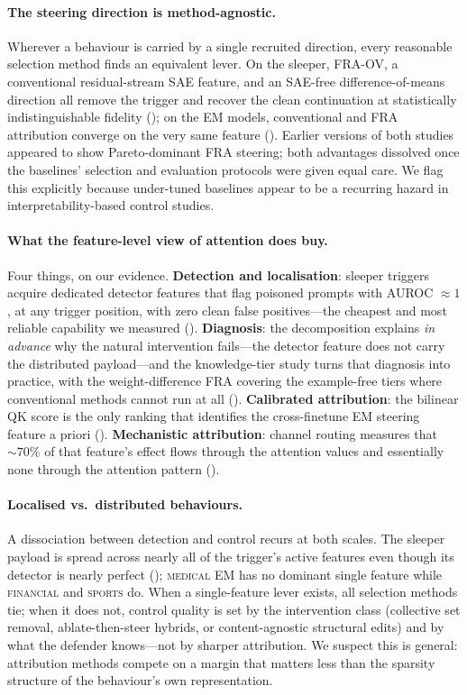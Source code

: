 \documentclass{article}
\theoremstyle{plain}
\theoremstyle{definition}
\theoremstyle{remark}
\begin{document}
\paragraph{The steering direction is method-agnostic.} Wherever a behaviour is carried by a single recruited direction, every reasonable selection method finds an equivalent lever. On the sleeper, FRA-OV, a conventional residual-stream SAE feature, and an SAE-free difference-of-means direction all remove the trigger and recover the clean continuation at statistically indistinguishable fidelity (); on the EM models, conventional and FRA attribution converge on the very same feature (). Earlier versions of both studies appeared to show Pareto-dominant FRA steering; both advantages dissolved once the baselines' selection and evaluation protocols were given equal care. We flag this explicitly because under-tuned baselines appear to be a recurring hazard in interpretability-based control studies.

\paragraph{What the feature-level view of attention does buy.} Four things, on our evidence. \textbf{Detection and localisation}: sleeper triggers acquire dedicated detector features that flag poisoned prompts with AUROC ${\approx}1$, at any trigger position, with zero clean false positives---the cheapest and most reliable capability we measured (). \textbf{Diagnosis}: the decomposition explains \emph{in advance} why the natural intervention fails---the detector feature does not carry the distributed payload---and the knowledge-tier study turns that diagnosis into practice, with the weight-difference FRA covering the example-free tiers where conventional methods cannot run at all (). \textbf{Calibrated attribution}: the bilinear QK score is the only ranking that identifies the cross-finetune EM steering feature a priori (). \textbf{Mechanistic attribution}: channel routing measures that ${\sim}70\%$ of that feature's effect flows through the attention values and essentially none through the attention pattern ().

\paragraph{Localised vs.\ distributed behaviours.} A dissociation between detection and control recurs at both scales. The sleeper payload is spread across nearly all of the trigger's active features even though its detector is nearly perfect (); \textsc{medical} EM has no dominant single feature while \textsc{financial} and \textsc{sports} do. When a single-feature lever exists, all selection methods tie; when it does not, control quality is set by the intervention class (collective set removal, ablate-then-steer hybrids, or content-agnostic structural edits) and by what the defender knows---not by sharper attribution. We suspect this is general: attribution methods compete on a margin that matters less than the sparsity structure of the behaviour's own representation.
\end{document}
